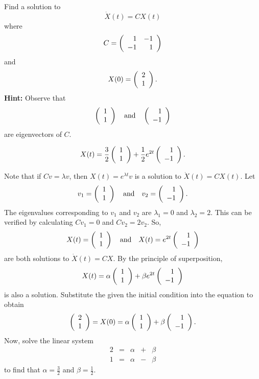 \documentclass{ximera}
\begin{document}
\begin{exercise} \label{c4.5.2}
Find a solution to
\[
\dot{X}(t)=CX(t)
\]
where
\[
C=\left(\begin{array}{rr} 1 & -1\\ -1 &1\end{array}\right)
\]
and
\[
X(0)=\left(\begin{array}{r} 2 \\ 1\end{array}\right).
\]
{\bf Hint:} Observe that
\[
\left(\begin{array}{r} 1 \\ 1\end{array}\right) \quad\mbox{and}\quad \left(\begin{array}{r} 1 \\ -1\end{array}\right)
\]
are eigenvectors of $C$.

\begin{solution}

\ans 
\[
X(t) = \frac{3}{2}\left(\begin{array}{r} 1 \\ 1\end{array}\right) + \frac{1}{2}e^{2t}\left(\begin{array}{r} 1 \\ -1\end{array}\right).
\]

\soln Note that if $Cv = \lambda v$, then $X(t) = e^{\lambda t}v$ is a
solution to $\dot{X}(t) = CX(t)$.  Let
\[
v_1 = \left(\begin{array}{r} 1 \\ 1\end{array}\right) \quad\mbox{and}\quad v_2 = \left(\begin{array}{r} 1 \\ -1\end{array}\right).
\]
The eigenvalues corresponding to $v_1$ and $v_2$ are
$\lambda_1 = 0$ and $\lambda_2 = 2$.  This can be verified
by calculating $Cv_1 = 0$ and $Cv_2 = 2v_2$.
So,
\[
X(t) = \left(\begin{array}{r} 1 \\ 1\end{array}\right) \quad\mbox{and}\quad X(t) = e^{2t}\left(\begin{array}{r} 1 \\ -1\end{array}\right)
\]
are both solutions to $\dot{X}(t) = CX$.  By the principle of
superposition,
\[
X(t) = \alpha\left(\begin{array}{r} 1 \\ 1\end{array}\right) + \beta e^{2t}\left(\begin{array}{r} 1 \\ -1\end{array}\right)
\]
is also a solution.
Substitute the given the initial condition into the equation to obtain
\[
\left(\begin{array}{r} 2 \\ 1\end{array}\right) = X(0) = \alpha\left(\begin{array}{r} 1 \\ 1\end{array}\right) + \beta\left(\begin{array}{r} 1 \\ -1\end{array}\right).
\]
Now, solve the linear system
\[
\begin{array}{rrrrr}
2 & = & \alpha & + & \beta \\
1 & = & \alpha & - & \beta \end{array}
\]
to find that $\alpha = \frac{3}{2}$ and $\beta = \frac{1}{2}$.


\end{solution}
\end{exercise}
\end{document}
